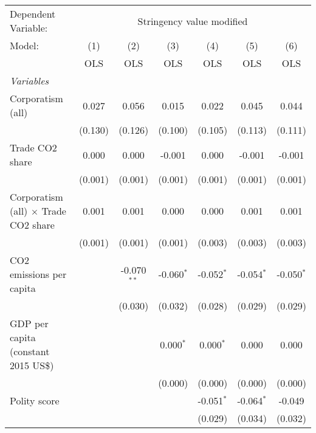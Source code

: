 
\begingroup
\centering
\begin{tabular}{lcccccc}
   \toprule
   Dependent Variable: & \multicolumn{6}{c}{Stringency value modified}\\
   Model:                                      & (1)     & (2)           & (3)          & (4)          & (5)          & (6)\\  
                                               &  OLS    & OLS           & OLS          & OLS          & OLS          & OLS\\  
   \midrule
   \emph{Variables}\\
   Corporatism (all)                           & 0.027   & 0.056         & 0.015        & 0.022        & 0.045        & 0.044\\   
                                               & (0.130) & (0.126)       & (0.100)      & (0.105)      & (0.113)      & (0.111)\\   
   Trade CO2 share                             & 0.000   & 0.000         & -0.001       & 0.000        & -0.001       & -0.001\\   
                                               & (0.001) & (0.001)       & (0.001)      & (0.001)      & (0.001)      & (0.001)\\   
   Corporatism (all) $\times$ Trade CO2 share  & 0.001   & 0.001         & 0.000        & 0.000        & 0.001        & 0.001\\   
                                               & (0.001) & (0.001)       & (0.001)      & (0.003)      & (0.003)      & (0.003)\\   
   CO2 emissions per capita                    &         & -0.070$^{**}$ & -0.060$^{*}$ & -0.052$^{*}$ & -0.054$^{*}$ & -0.050$^{*}$\\   
                                               &         & (0.030)       & (0.032)      & (0.028)      & (0.029)      & (0.029)\\   
   GDP per capita (constant 2015 US\$)         &         &               & 0.000$^{*}$  & 0.000$^{*}$  & 0.000        & 0.000\\   
                                               &         &               & (0.000)      & (0.000)      & (0.000)      & (0.000)\\   
   Polity score                                &         &               &              & -0.051$^{*}$ & -0.064$^{*}$ & -0.049\\   
                                               &         &               &              & (0.029)      & (0.034)      & (0.032)\\   

\end{tabular}
